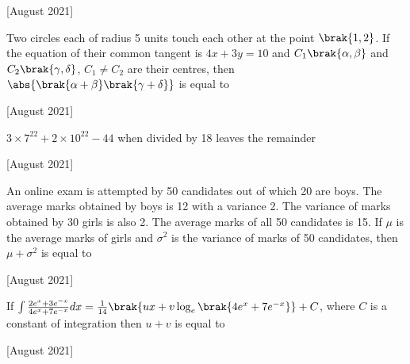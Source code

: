     \hfill [August 2021]
    
    \item Two circles each of radius 5 units touch each other at the point $\brak{1,2}$. If the equation of their common tangent is $4x + 3y = 10$ and $C_1 \brak{\alpha,\beta}$ and $C_2 \brak{\gamma, \delta}$, $C_1 \neq C_2$ are their centres, then $\abs{\brak{\alpha+\beta}\brak{\gamma+\delta}}$
    is equal to 
    
    \hfill [August 2021]
    
    \item $3 \times 7^{22} + 2 \times 10^{22} - 44$ when divided by 18 leaves the remainder  
    
    \hfill [August 2021]
    
    \item An online exam is attempted by 50 candidates out of which 20 are boys. The average marks obtained by boys is 12 with a variance 2. The variance of marks obtained by 30 girls is also 2. The average marks of all 50 candidates is 15. If $\mu$ is the average marks of girls and $\sigma ^2$
 is the variance of marks of 50 candidates, then 
$\mu + \sigma^2$ is equal to

\hfill[August 2021]
\item If $\int \frac{2e^x + 3e^{-x}}{4e^x+ 7e^{-x}}dx = \frac{1}{14} \brak{ux + v \log_e \brak{4e^x + 7e^{-x}}} + C$, where $C$ is a constant of integration then $u + v$ is equal to 

\hfill [August 2021]